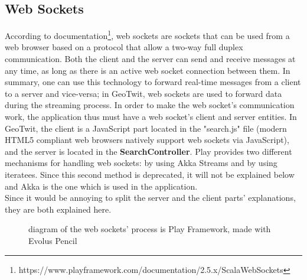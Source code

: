 \documentclass[a4paper,11pt]{report}
\begin{document}
\subsection{Web Sockets}
\label{webSockets}
According to documentation\footnote{https://www.playframework.com/documentation/2.5.x/ScalaWebSockets}, web sockets are sockets that can be used from a web browser based on a protocol that allow a two-way full duplex communication. Both the client and the server can send and receive messages at any time, as long as there is an active web socket connection between them. In summary, one can use this technology to forward real-time messages from a client to a server and vice-versa; in GeoTwit, web sockets are used to forward data during the streaming process.
\newpage
In order to make the web socket's communication work, the application thus must have a web socket's client and server entities. In GeoTwit, the client is a JavaScript part located in the "search.js" file (modern HTML5 compliant web browsers natively support web sockets via JavaScript), and the server is located in the \textbf{SearchController}. Play provides two different mechanisms for handling web sockets: by using Akka Streams and by using iteratees. Since this second method is deprecated, it will not be explained below and Akka is the one which is used in the application.\\

Since it would be annoying to split the server and the client parts' explanations, they are both explained here.
\begin{figure}[H]
\vspace{-5pt}
\begin{center}
\vspace{-20pt}
\caption{diagram of the web sockets' process is Play Framework, made with Evolus Pencil}
\end{center}
\end{figure}
\vspace{-15pt}
\end{document}
